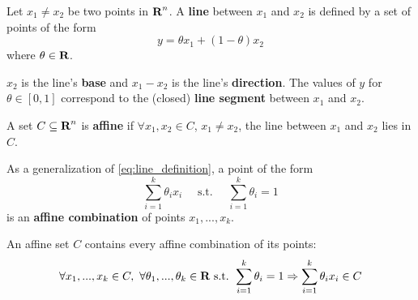 


\begin{Definition}
  Let $x_1\ne x_2$ be two points in $\textbf{R}^n$. A \textbf{line} between $x_1$
  and $x_2$ is defined by a set of points of the form
  \begin{equation}
    \label{eq:line_definition}
    y = \theta x_1+(1-\theta)x_2
  \end{equation}
  where $\theta\in\textbf{R}$.
  
  
  $x_2$ is the line's \textbf{base} and $x_1-x_2$ is the line's
  \textbf{direction}. The values of $y$ for $\theta\in [0,1]$ correspond to the
  (closed) \textbf{line segment} between $x_1$ and $x_2$.  
\end{Definition}

\begin{Definition}
  A set $C\subseteq \textbf{R}^n$ is \textbf{affine} if $\forall x_1,x_2\in C$,
  $x_1\ne x_2$, the line between $x_1$ and $x_2$ lies in $C$.
\end{Definition}

\begin{Definition}
  As a generalization of \eqref{eq:line_definition}, a point of the form
  \begin{equation}
    \label{eq:2}
    \sum_{i=1}^k \theta_ix_i\quad\text{ s.t. }\quad \sum_{i=1}^k\theta_i=1
  \end{equation}
  is an \textbf{affine combination} of points $x_1,...,x_k$. 
\end{Definition}

\begin{Fact}
  An affine set $C$ contains every affine combination of its points:
  \begin{equation*}
    \forall x_1,...,x_k\in C,\,\,\forall \theta_1,...,\theta_k\in\textbf{R}\text{
      s.t. }\sum_{i=1}^k\theta_i=1\Rightarrow \sum_{i=1}^k\theta_ix_i \in C
  \end{equation*}
  
\end{Fact}

